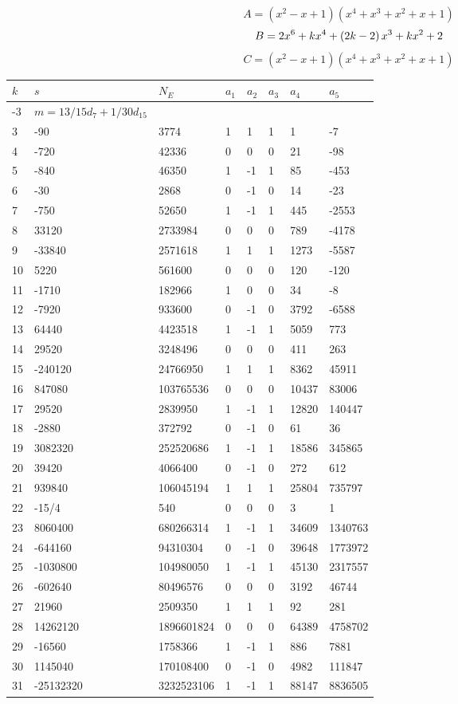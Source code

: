 \documentclass{amsart}
\begin{document}
$$A=(x^2
 - x
 + 1)(x^4
 + x^3
 + x^2
 + x
 + 1)$$
$$B=2\*x^6
 + k\*x^4
 + \left(2\*k
 - 2\right) \*x^3
 + k\*x^2
 + 2$$
$$C=(x^2
 - x
 + 1)(x^4
 + x^3
 + x^2
 + x
 + 1)$$
\begin{longtable}{|l|l|l|lllll|}
\hline
$k$ & $s$ & $N_E$ & $a_1$ & $a_2$ & $a_3$ & $a_4$ & $a_5$\\
\hline
-3&$m=13/15d_{7}+1/30d_{15}$&&\multicolumn{5}{c|}{}\\
3&-90&3774&1&1&1&1&-7\\
4&-720&42336&0&0&0&21&-98\\
5&-840&46350&1&-1&1&85&-453\\
6&-30&2868&0&-1&0&14&-23\\
7&-750&52650&1&-1&1&445&-2553\\
8&33120&2733984&0&0&0&789&-4178\\
9&-33840&2571618&1&1&1&1273&-5587\\
10&5220&561600&0&0&0&120&-120\\
11&-1710&182966&1&0&0&34&-8\\
12&-7920&933600&0&-1&0&3792&-6588\\
13&64440&4423518&1&-1&1&5059&773\\
14&29520&3248496&0&0&0&411&263\\
15&-240120&24766950&1&1&1&8362&45911\\
16&847080&103765536&0&0&0&10437&83006\\
17&29520&2839950&1&-1&1&12820&140447\\
18&-2880&372792&0&-1&0&61&36\\
19&3082320&252520686&1&-1&1&18586&345865\\
20&39420&4066400&0&-1&0&272&612\\
21&939840&106045194&1&1&1&25804&735797\\
22&-15/4&540&0&0&0&3&1\\
23&8060400&680266314&1&-1&1&34609&1340763\\
24&-644160&94310304&0&-1&0&39648&1773972\\
25&-1030800&104980050&1&-1&1&45130&2317557\\
26&-602640&80496576&0&0&0&3192&46744\\
27&21960&2509350&1&1&1&92&281\\
28&14262120&1896601824&0&0&0&64389&4758702\\
29&-16560&1758366&1&-1&1&886&7881\\
30&1145040&170108400&0&-1&0&4982&111847\\
31&-25132320&3232523106&1&-1&1&88147&8836505\\

\end{longtable}
\end{document}
